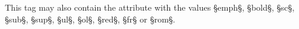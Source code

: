 \eins \quad This tag may also contain the  attribute with the values §emph§, §bold§, §sc§, §sub§, §sup§, §ul§, §ol§, §red§, §fr§ or §rom§.






